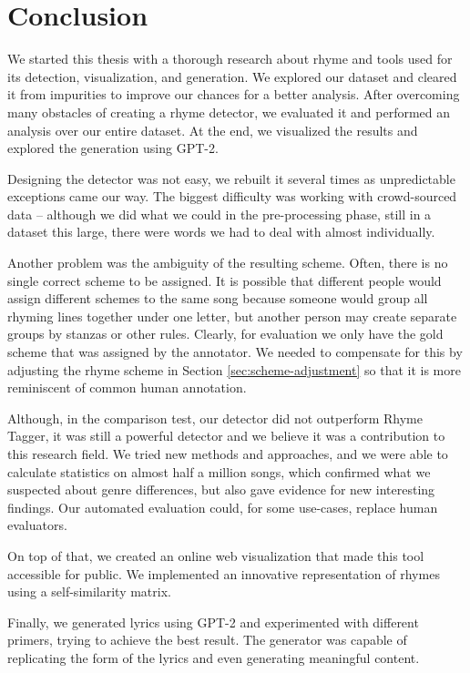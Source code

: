\chapter*{Conclusion}\label{conclusion}
We started this thesis with a thorough research about rhyme and tools used for its detection, visualization, and generation. We explored our dataset and cleared it from impurities to improve our chances for a better analysis. After overcoming many obstacles of creating a rhyme detector, we evaluated it and performed an analysis over our entire dataset. At the end, we visualized the results and explored the generation using GPT-2.

Designing the detector was not easy, we rebuilt it several times as unpredictable exceptions came our way. The biggest difficulty was working with crowd-sourced data -- although we did what we could in the pre-processing phase, still in a dataset this large, there were words we had to deal with almost individually.

Another problem was the ambiguity of the resulting scheme. Often, there is no single correct scheme to be assigned. It is possible that different people would assign different schemes to the same song because someone would group all rhyming lines together under one letter, but another person may create separate groups by stanzas or other rules. Clearly, for evaluation we only have the gold scheme that was assigned by the annotator. We needed to compensate for this by adjusting the rhyme scheme in Section \ref{sec:scheme-adjustment} so that it is more reminiscent of common human annotation.

Although, in the comparison test, our detector did not outperform Rhyme Tagger, it was still a powerful detector and we believe it was a contribution to this research field. We tried new methods and approaches, and we were able to calculate statistics on almost half a million songs, which confirmed what we suspected about genre differences, but also gave evidence for new interesting findings. Our automated evaluation could, for some use-cases, replace human evaluators.

On top of that, we created an online web visualization that made this tool accessible for public. We implemented an innovative representation of rhymes using a self-similarity matrix.

Finally, we generated lyrics using GPT-2 and experimented with different primers, trying to achieve the best result. The generator was capable of replicating the form of the lyrics and even generating meaningful content. 

